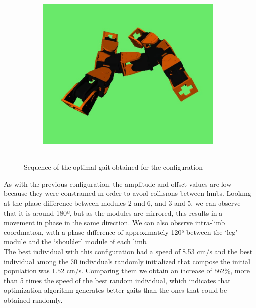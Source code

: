 \begin{figure}[h]
\begin{subfigure}[b]{0.25\textwidth}
                 \\~
        \end{subfigure}
        ~
        \begin{subfigure}[b]{0.25\textwidth}
         	   \centering
                \includegraphics[width=\textwidth]{images/results_11_gait_09.png}
                 \\~
        \end{subfigure}
        \caption{Sequence of the optimal gait obtained for the \robotEleven configuration}
        \label{fig:result_11_gait}
\end{figure}

As with the previous configuration, the amplitude and offset values are low because they were constrained in order to avoid collisions between limbs. Looking at the phase difference between modules 2 and 6, and 3 and 5, we can observe that it is around 180º, but as the modules are mirrored, this results in a movement in phase in the same direction. We can also observe intra-limb coordination, with a phase difference of approximately 120º between the `leg' module and the `shoulder' module of each limb. \\

The best individual with this configuration had a speed of 8.53 cm/s and the best individual among the 30 individuals randomly initialized that compose the initial population was 1.52 cm/s. Comparing them we obtain an increase of 562\%, more than 5 times the speed of the best random individual, which indicates that optimization algorithm generates better gaits than the ones that could be obtained randomly.\\


